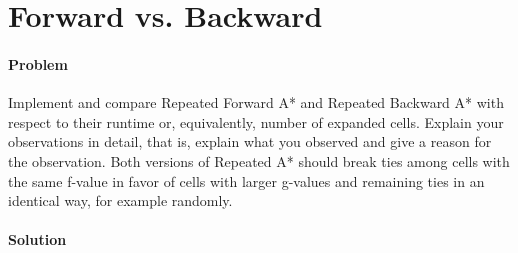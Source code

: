 \section{Forward vs. Backward}

\paragraph{Problem}
Implement and compare Repeated Forward A* and Repeated Backward A* with respect
to their runtime or, equivalently, number of expanded cells. Explain your
observations in detail, that is, explain what you observed and give a reason
for the observation. Both versions of Repeated A* should break ties among cells
with the same f-value in favor of cells with larger g-values and remaining ties
in an identical way, for example randomly.

\paragraph{Solution}
